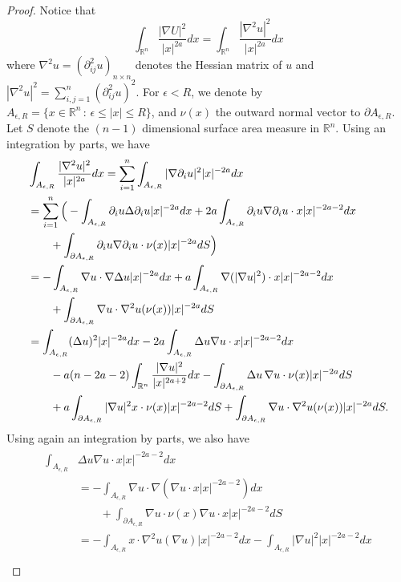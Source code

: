 \documentclass[a4paper,12pt]{article}
\theoremstyle{plain}
\theoremstyle{definition}
\theoremstyle{remark}
\def\R{\mathbb R}%
\def\ep{\epsilon}%
\def\pa{\partial}%
\def\irn{\int_{\R^n}}
\numberwithin{equation}{section}
\begin{document}
\begin{proof}
Notice that 
\[
\int_{\R^n} \frac{|\nabla U|^2}{|x|^{2a}} dx = \int_{\R^n} \frac{|\nabla^2 u|^2}{|x|^{2a}} dx
\]
where $\nabla^2 u = (\partial_{ij}^2 u)_{n\times n}$ denotes the Hessian matrix of $u$ and $|\nabla^2 u|^2 = \sum_{i,j=1}^n (\partial^2_{ij}u)^2$. For $\ep < R$, we denote by $A_{\ep,R} = \{x\in \R^n\,: \, \ep \leq |x| \leq R\}$, and $\nu(x)$ the outward normal vector to $\pa A_{\ep,R}$. Let $S$ denote the $(n-1)$ dimensional surface area measure in $\R^n$. Using an integration by parts, we have
\begin{align}\label{eth1}
&	\int_{A_{\ep,R}} \frac{|\nabla^2 u|^2}{|x|^{2a}} dx= \sum_{i=1}^n \int_{A_{\ep,R}} |\nabla \partial_iu|^2 |x|^{-2a} dx\\ \notag
& = \sum_{i=1}^n \Big(-\int_{A_{\ep,R}} \partial_i u \Delta \partial_i u |x|^{-2a} dx + 2a \int_{A_{\ep,R}} \partial_i u \nabla\partial_i u \cdot x |x|^{-2a -2} dx\\\notag
&\qquad + \int_{\partial A_{\ep,R}} \partial_i u \nabla\partial_i u \cdot \nu(x) |x|^{-2a} dS\Big)\\\notag
&=-\int_{A_{\ep,R}} \nabla u \cdot \nabla\Delta u |x|^{-2a} dx  + a \int_{A_{\ep,R}} \nabla(|\nabla u|^2) \cdot x |x|^{-2a -2} dx\\\notag
&\qquad + \int_{\partial A_{\ep,R}} \nabla u \cdot \nabla^2 u(\nu(x)) |x|^{-2a} dS\\\notag
&=\int_{A_{\ep,R}} (\Delta u)^2 |x|^{-2a} dx - 2a \int_{A_{\ep,R}} \Delta u \nabla u\cdot x|x|^{-2a -2} dx\\\notag
&\qquad -a(n -2a-2) \irn \frac{|\nabla u|^2}{|x|^{2a +2} } dx  -\int_{\partial A_{\ep,R}} \Delta u\, \nabla u \cdot \nu(x) |x|^{-2a} dS\\ \notag
&\qquad + a\int_{\partial A_{\ep,R}} |\nabla u|^2 x \cdot \nu(x) |x|^{-2a-2} dS + \int_{\partial A_{\ep,R}} \nabla u \cdot \nabla^2 u(\nu(x)) |x|^{-2a} dS.
\end{align}
Using again an integration by parts, we also have
\begin{align}\label{eth2}
\begin{split}
	\int_{A_{\ep,R}} &\Delta u \nabla u\cdot x|x|^{-2a -2} dx \\
&= -\int_{A_{\ep,R}} \nabla u \cdot \nabla(\nabla u\cdot x |x|^{-2a -2}) dx\\
	&\qquad + \int_{\partial A_{\ep,R}} \nabla u \cdot \nu(x) \nabla u\cdot x |x|^{-2a -2} dS\\
&= -\int_{A_{\ep,R}} x \cdot \nabla^2u (\nabla u) |x|^{-2a -2} dx - \int_{A_{\ep,R}} |\nabla u|^2 |x|^{-2a -2} dx\\

\end{split}
\end{align}
\end{proof}
\end{document}
